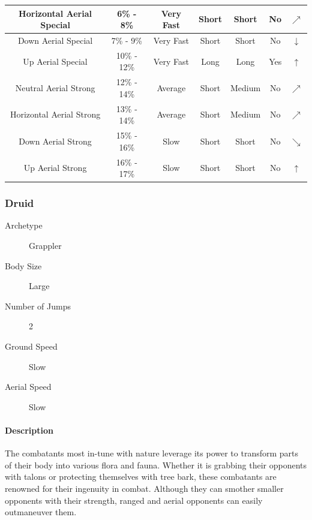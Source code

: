 \begin{table}[h!]
\begin{tabular}{| c | c | c | c | c | c | c |}
        \hline
        Horizontal Aerial Special & 6\% - 8\% & Very Fast & Short & Short & No & $\nearrow$ \\
        \hline
        Down Aerial Special & 7\% - 9\% & Very Fast & Short & Short & No & $\downarrow$ \\
        \hline
        Up Aerial Special & 10\% - 12\% & Very Fast & Long & Long & Yes & $\uparrow$ \\
        \hline
        Neutral Aerial Strong & 12\% - 14\% & Average & Short & Medium & No & $\nearrow$ \\
        \hline
        Horizontal Aerial Strong & 13\% - 14\% & Average & Short & Medium & No & $\nearrow$ \\
        \hline
        Down Aerial Strong & 15\% - 16\% & Slow & Short & Short & No & $\searrow$ \\
        \hline
        Up Aerial Strong & 16\% - 17\% & Slow & Short & Short & No & $\uparrow$ \\
        \hline
    \end{tabular}
\end{table}

\pagebreak

\subsubsection{Druid}

\begin{description}
    \item[Archetype] Grappler
    \item[Body Size] Large
    \item[Number of Jumps] 2 
    \item[Ground Speed] Slow
    \item[Aerial Speed] Slow   
\end{description}

\paragraph{Description} The combatants most in-tune with nature leverage its power to transform parts of their body into various flora and fauna. Whether it is grabbing their opponents with talons or protecting themselves with tree bark, these combatants are renowned for their ingenuity in combat. Although they can smother smaller opponents with their strength, ranged and aerial opponents can easily outmaneuver them.

